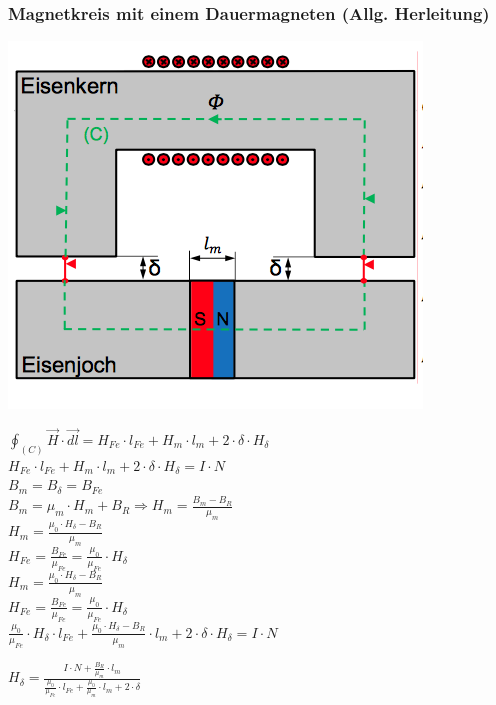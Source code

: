 \subsubsection{Magnetkreis mit einem Dauermagneten (Allg. Herleitung)}
\begin{minipage}{0.4 \linewidth}
\includegraphics[width = \linewidth]{./Pics/VL2/permMagnet}
\end{minipage}
\begin{minipage}{0.6 \linewidth}
$\oint_{(C)} \vec{H} \cdot \vec{dl} = H_{Fe} \cdot l_{Fe} + H_{m} \cdot l_{m} + 2 \cdot \delta \cdot H_{\delta} $ \\

$H_{Fe} \cdot l_{Fe} + H_{m} \cdot l_{m} + 2 \cdot \delta \cdot H_{\delta} = I \cdot N$ \\

$B_m = B_\delta = B_{Fe}$ \\

$B_m = \mu_m \cdot H_m + B_R \Rightarrow H_m = \frac{B_m - B_R}{\mu_m}$ \\

$H_m =  \frac{\mu_0 \cdot H_\delta  - B_R}{\mu_m}$\\

$H_{Fe} = \frac{B_{Fe}}{\mu_{Fe}} = \frac{\mu_0}{\mu_{Fe}} \cdot H_\delta$\\

$H_m = \frac{\mu_0 \cdot H_\delta - B_R}{\mu_m}$\\

$H_{Fe} = \frac{B_{Fe}}{\mu_{Fe}} = \frac{\mu_0}{\mu_{Fe}}\cdot H_\delta $ \\

$\frac{\mu_0}{\mu_{Fe}} \cdot H_\delta \cdot l_{Fe} + \frac{\mu_0 \cdot H_\delta - B_R}{\mu_m} \cdot l_m + 2 \cdot \delta \cdot H_\delta = I \cdot N$

$H_\delta = \frac{I \cdot N + \frac{B_R}{\mu_m} \cdot l_m}{\frac{\mu_0}{\mu_{Fe}} \cdot l_{Fe} + \frac{\mu_0}{\mu_m} \cdot l_m + 2 \cdot \delta}$
\end{minipage}


